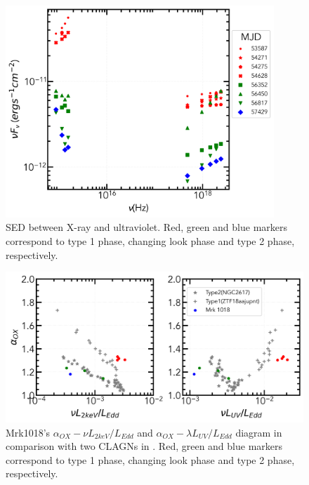 \documentclass[twocolumn]{aastex63}
\begin{document}
\begin{figure}
\centering
	\includegraphics[width=0.9\textwidth]{./pic/Mrk1018_sed.png}
    \caption{SED between X-ray and ultraviolet. Red, green and blue markers correspond to type 1 phase, changing look phase and type 2 phase, respectively. }
    \label{fig:xray-uvot-sed}
\end{figure}

\begin{figure}
\centering
	\includegraphics[width=\textwidth]{./pic/Mrk1018_subplots_plus_2individuals_alpha_ox_L_x_Luv_rate.png}
    \caption{Mrk1018's $\alpha_{OX}-\nu L_{2keV}/L_{Edd}$ and $\alpha_{OX}-\lambda L_{UV}/L_{Edd}$ diagram in comparison with two CLAGNs in \citet{2019arXiv190904676R}. Red, green and blue markers correspond to type 1 phase, changing look phase and type 2 phase, respectively. }
    \label{fig:alpha_ox_lx_luv}
\end{figure}
\end{document}
